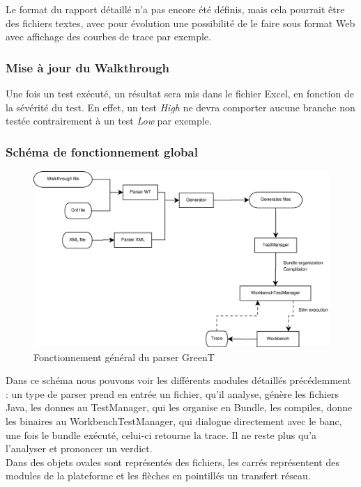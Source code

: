 	Le format du rapport détaillé n'a pas encore été définis, mais cela pourrait être des fichiers textes, avec pour évolution une possibilité de le faire sous format Web avec affichage des courbes de trace par exemple.

	\subsubsection{Mise à jour du Walkthrough}
	Une fois un test exécuté, un résultat sera mis dans le fichier Excel, en fonction de la sévérité du test. En effet, un test \textit{High} ne devra comporter aucune branche non testée contrairement à un test \textit{Low} par exemple.
	\vfill ~\vfill
	
	\subsubsection{Schéma de fonctionnement global}
		\begin{figure}[H]
			\centering
			\includegraphics[width=18.5cm]{contents/images/generalDiag.eps}
			\caption{Fonctionnement général du parser GreenT}
			\label{fig:generalDig}
		\end{figure}
		Dans ce schéma nous pouvons voir les différents modules détaillés précédemment : un type de parser prend en entrée un fichier, qu'il analyse, génère les fichiers Java, les donnes au TestManager, qui les organise en Bundle, les compiles, donne les binaires au WorkbenchTestManager, qui dialogue directement avec le banc, une fois le bundle exécuté, celui-ci retourne la trace. Il ne reste plus qu'a l'analyser et prononcer un verdict.\\
		Dans des objets ovales sont représentés des fichiers, les carrés représentent des modules de la plateforme et les flèches en pointillés un transfert réseau.


